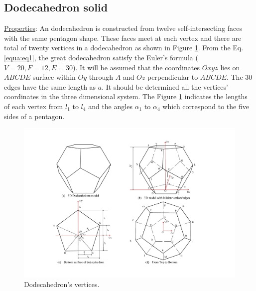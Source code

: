 \subsection{Dodecahedron solid}


\noindent\uline{Properties}: 
An dodecahedron is constructed from twelve self-intersecting faces with the same pentagon shape. These faces meet at each vertex and there are total of twenty vertices in a dodecahedron as shown in Figure \ref{fig:dodecahedron2}.
%
From the Eq. \ref{equa:eq1}, the great dodecahedron satisfy the Euler's formula ($V=20, F=12, E=30$).
%
It will be assumed that the coordinates $Oxyz$ lies on $ABCDE$ surface within $Oy$ through $A$ and $Oz$ perpendicular to $ABCDE$.
%
The 30 edges have the same length as $a$. It should be determined all the vertices' coordinates in the three dimensional system.
%
The Figure \ref{fig:dodecahedron2} indicates the lengths of each vertex from $l_1$ to $l_4$ and the angles $\alpha_1$ to $\alpha_4$ which correspond to the five sides of a pentagon.

\begin{figure}[h]
\centering
	\includegraphics[width=1\textwidth]{image/dodecahedron2.pdf}
	\caption{Dodecahedron's vertices.}
	\label{fig:dodecahedron2}
\end{figure}

